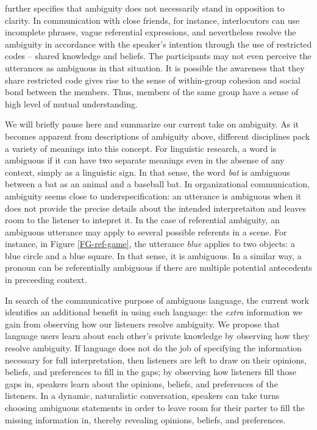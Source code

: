 \documentclass[10pt,a4paper]{article}
\begin{document}
 further specifies that ambiguity does not necessarily stand in opposition to clarity. In communication with close friends, for instance, interlocutors can use incomplete phrases, vague referential expressions, and nevertheless resolve the ambiguity in accordance with the speaker's intention through the use of restricted codes -- shared knowledge and beliefs. The participants may not even perceive the utterances as ambiguous in that situation. It is possible the awareness that they share restricted code gives rise to the sense of within-group cohesion and social bond between the members. Thus, members of the same group have a sense of high level of mutual understanding.

We will briefly pause here and summarize our current take on ambiguity. As it  becomes apparent from descriptions of ambiguity above, different disciplines pack a variety of meanings into this concept. For linguistic research, a word is ambiguous if it can have two separate meanings even in the absense of any context, simply as a linguistic sign. In that sense, the word \textit{bat} is ambiguous between a bat as an animal and a baseball bat. In organizational communication, ambiguity seems close to underspecification: an utterance is ambiguous when it does not provide the precise details about the intended interpretaiton and leaves room to the listener to intepret it. In the case of referential ambiguity, an ambiguous utterance may apply to several possible referents in a scene. For instance, in Figure \ref{FG-ref-game}, the utterance \textit{blue} applies to two objects: a blue circle and a blue square. In that sense, it is ambiguous. In a similar way, a  pronoun can be referentially ambiguous if there are multiple potential antecedents in preceeding context.


In search of the communicative purpose of ambiguous language, the current work identifies an additional benefit in using such language: the \emph{extra} information we gain from observing how our listeners resolve ambiguity.
We propose that language users learn about each other's private knowledge by observing how they resolve ambiguity. If language does not do the job of specifying the information necessary for full interpretation, then listeners are left to draw on their opinions, beliefs, and preferences to fill in the gaps; by observing how listeners fill those gaps in, speakers learn about the opinions, beliefs, and preferences of the listeners.
In a dynamic, naturalistic conversation, speakers can take turns choosing ambiguous statements in order to leave room for their parter to fill the missing information in, thereby revealing opinions, beliefs, and preferences. 
\end{document}
